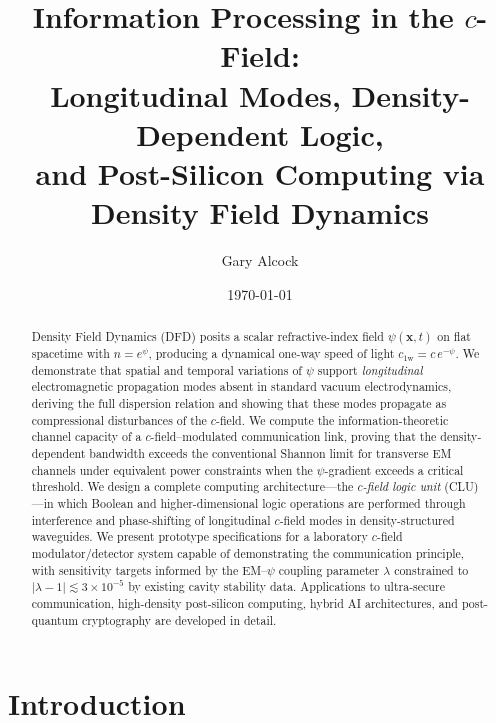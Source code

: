\documentclass[aps,prd,twocolumn,superscriptaddress,nofootinbib,floatfix]{revtex4-2}
\newcommand{\psifield}{\psi}
\newcommand{\cfield}{c_{\text{1w}}}
\newcommand{\cvac}{c}
\newcommand{\xvec}{\mathbf{x}}
\begin{document}
\title{Information Processing in the $c$-Field:\\
Longitudinal Modes, Density-Dependent Logic,\\
and Post-Silicon Computing via Density Field Dynamics}

\author{Gary Alcock}

\date{\today}

\begin{abstract}
Density Field Dynamics (DFD) posits a scalar refractive-index field
$\psifield(\xvec,t)$ on flat spacetime with $n = e^{\psifield}$,
producing a dynamical one-way speed of light
$\cfield = \cvac\, e^{-\psifield}$.
We demonstrate that spatial and temporal variations of $\psifield$
support \emph{longitudinal} electromagnetic propagation modes absent
in standard vacuum electrodynamics, deriving the full dispersion
relation and showing that these modes propagate as compressional
disturbances of the $c$-field.
We compute the information-theoretic channel capacity of a
$c$-field--modulated communication link, proving that the
density-dependent bandwidth exceeds the conventional Shannon limit
for transverse EM channels under equivalent power constraints when
the $\psifield$-gradient exceeds a critical threshold.
We design a complete computing architecture---the \emph{$c$-field
logic unit} (CLU)---in which Boolean and higher-dimensional logic
operations are performed through interference and phase-shifting of
longitudinal $c$-field modes in density-structured waveguides.
We present prototype specifications for a laboratory $c$-field
modulator/detector system capable of demonstrating the
communication principle, with sensitivity targets informed by the
EM--$\psifield$ coupling parameter $\lambda$ constrained to
$|\lambda - 1| \lesssim 3\times10^{-5}$ by existing cavity
stability data.
Applications to ultra-secure communication, high-density post-silicon
computing, hybrid AI architectures, and post-quantum cryptography
are developed in detail.
\end{abstract}

\maketitle
\tableofcontents

\section{Introduction}
\label{sec:intro}
\end{document}
